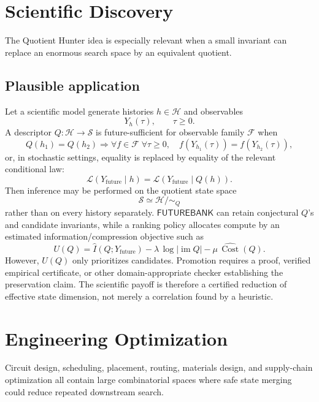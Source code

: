 \documentclass[11pt]{article}
\newcommand{\FB}{\mathsf{FUTUREBANK}}
\newcommand{\Cost}{\operatorname{Cost}}
\begin{document}
\section{Scientific Discovery}
The Quotient Hunter idea is especially relevant when a small invariant can replace an enormous search
space by an equivalent quotient.

\subsection*{Plausible application}
Let a scientific model generate histories \(h\in\mathcal H\) and observables
\[
Y_h(\tau),\qquad \tau\ge 0.
\]
A descriptor \(Q:\mathcal H\to\mathcal S\) is future-sufficient for observable family \(\mathcal F\)
when
\[
Q(h_1)=Q(h_2)
\Longrightarrow
\forall f\in\mathcal F\;\forall\tau\ge0,\quad
f(Y_{h_1}(\tau))=f(Y_{h_2}(\tau)),
\]
or, in stochastic settings, equality is replaced by equality of the relevant conditional law:
\[
\mathcal L(Y_{\mathrm{future}}\mid h)
=
\mathcal L(Y_{\mathrm{future}}\mid Q(h)).
\]
Then inference may be performed on the quotient state space
\[
\mathcal S\simeq\mathcal H/\!\sim_Q
\]
rather than on every history separately. \(\FB\) can retain conjectural \(Q\)'s and candidate invariants,
while a ranking policy allocates compute by an estimated information/compression objective such as
\[
U(Q)=
\widehat I(Q;Y_{\mathrm{future}})
-\lambda\,\log |\operatorname{im}Q|
-\mu\,\widehat{\Cost}(Q).
\]
However, \(U(Q)\) only prioritizes candidates. Promotion requires a proof, verified empirical
certificate, or other domain-appropriate checker establishing the preservation claim. The scientific
payoff is therefore a certified reduction of effective state dimension, not merely a correlation found
by a heuristic.

\section{Engineering Optimization}
Circuit design, scheduling, placement, routing, materials design, and supply-chain optimization all
contain large combinatorial spaces where safe state merging could reduce repeated downstream search.
\end{document}
